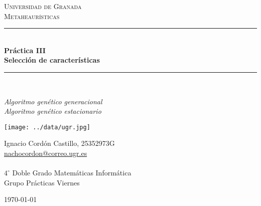 \documentclass[a4paper,11pt]{article}
\begin{document}
\begin{titlepage}

\newcommand{\HRule}{\rule{\linewidth}{0.5mm}} %

\center %
 
\textsc{\LARGE Universidad de Granada}\\[1.5cm]
\textsc{\Large Metaheaurísticas}\\[0.5cm] 

\bigskip
\HRule \\[0.4cm]
{ \huge \bfseries Práctica III}\\[0.4cm] %
{ \huge \bfseries Selección de características}\\
\HRule \\[1.5cm]
 

\begin{minipage}{\textwidth}
\begin{center} \large
\emph{Algoritmo genético generacional}\\
\emph{Algoritmo genético estacionario}\\
\end{center}
\end{minipage}


\begin{center}
\texttt{[image: ../data/ugr.jpg]}
\end{center}

\begin{minipage}{\textwidth}
\begin{center} \large
Ignacio Cordón Castillo, 25352973G\\
\url{nachocordon@correo.ugr.es}\\
\ \\
$4^{\circ}$ Doble Grado Matemáticas Informática\\
Grupo Prácticas Viernes
\end{center}
\end{minipage}


\vspace{\fill}%
\large\today
\end{titlepage}  
\end{document}
